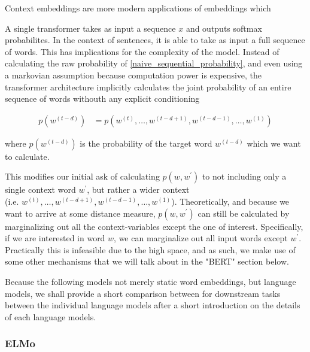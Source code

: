 \documentclass[a4paper,12pt,twoside,openright]{report}
\begin{document}
Context embeddings are more modern applications of embeddings which 

A single transformer takes as input a sequence $x$ and outputs softmax probabilites.
In the context of sentences, it is able to take as input a full sequence of words.
This has implications for the complexity of the model.
Instead of calculating the raw probability of \eqref{naive_sequential_probability}, and even using a markovian assumption because computation power is expensive, the transformer architecture implicitly calculates the joint probability of an entire sequence of words withouth any explicit conditioning


\begin{align}
p(w^{(t-d)}) &= p(w^{(t)}, \ldots, w^{(t-d + 1)}, w^{(t-d - 1)}, \ldots, w^{(1)})
\end{align}{\label{eq:transformer_probability}}

where $p(w^{(t-d)})$ is the probability of the target word $w^{(t-d)}$ which we want to calculate.

This modifies our initial ask of calculating $p(w, w^{\prime})$ to not including only a single context word $w^{\prime}$, but rather a wider context \\ (i.e. $w^{(t)}, \ldots, w^{(t-d + 1)}, w^{(t-d - 1)}, \ldots, w^{(1)}$).
Theoretically, and because we want to arrive at some distance measure, $p(w, w^{\prime})$ can still be calculated by marginalizing out all the context-variables except the one of interest.
Specifically, if we are interested in word $w$, we can marginalize out all input words except $w^{\prime}$.
Practically this is infeasible due to the high space, and as such, we make use of some other mechanisms that we will talk about in the "BERT" section below.


Because the following models not merely static word embeddings, but language models, we shall provide a short comparison between for downstream tasks between the individual language models after a short introduction on the details of each language models.

\subsubsection{ELMo}
\end{document}
